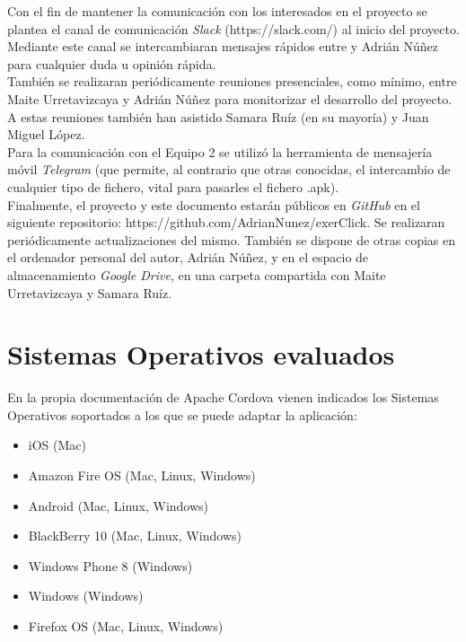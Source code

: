 Con el fin de mantener la comunicación con los interesados en el proyecto se plantea el canal de comunicación \textit{Slack} (https://slack.com/) al inicio del proyecto. Mediante este canal se intercambiaran mensajes rápidos entre  y Adrián Núñez para cualquier duda u opinión rápida.\\

También se realizaran periódicamente reuniones presenciales, como mínimo, entre Maite Urretavizcaya y Adrián Núñez para monitorizar el desarrollo del proyecto. A estas reuniones también han asistido Samara Ruíz (en su mayoría) y Juan Miguel López.\\

Para la comunicación con el Equipo 2 se utilizó la herramienta de mensajería móvil \textit{Telegram} (que permite, al contrario que otras conocidas, el intercambio de cualquier tipo de fichero, vital para pasarles el fichero .apk).\\

Finalmente, el proyecto y este documento estarán públicos en \textit{GitHub} en el siguiente repositorio: https://github.com/AdrianNunez/exerClick. Se realizaran periódicamente actualizaciones del mismo. También se dispone de otras copias en el ordenador personal del autor, Adrián Núñez, y en el espacio de almacenamiento \textit{Google Drive}, en una carpeta compartida con Maite Urretavizcaya y Samara Ruíz.\\

\section{Sistemas Operativos evaluados}
\label{sistemas-operativos}

En la propia documentación de Apache Cordova vienen indicados los Sistemas Operativos soportados a los que se puede adaptar la aplicación:

\begin{itemize}
\item iOS (Mac)
\item Amazon Fire OS (Mac, Linux, Windows)
\item Android (Mac, Linux, Windows)
\item BlackBerry 10 (Mac, Linux, Windows)
\item Windows Phone 8 (Windows)
\item Windows (Windows)
\item Firefox OS (Mac, Linux, Windows)
\end{itemize}

